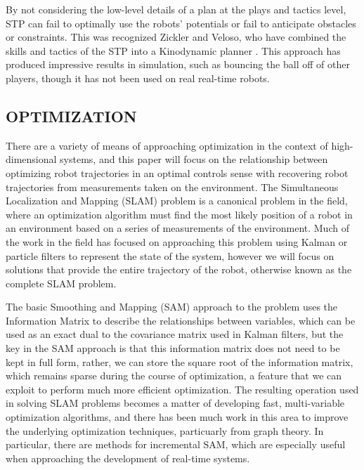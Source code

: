 \documentclass[a4paper, 10pt, conference]{ieeeconf}      %
\begin{document}
By not considering the low-level details of a plan at the plays and tactics level, STP can fail to optimally use the robots' potentials or fail to anticipate obstacles or constraints. This was recognized Zickler and Veloso, who have combined the skills and tactics of the STP into a Kinodynamic planner \cite{zickler2008playing}. This approach has produced impressive results in simulation, such as bouncing the ball off of other players, though it has not been used on real real-time robots.

\subsection{OPTIMIZATION}

There are a variety of means of approaching optimization in the context of high-dimensional systems, and this paper will focus on the relationship between optimizing robot trajectories in an optimal controls sense with recovering robot trajectories from measurements taken on the environment.  The Simultaneous Localization and Mapping (SLAM) problem is a canonical problem in the field, where an optimization algorithm must find the most likely position of a robot in an environment based on a series of measurements of the environment.  Much of the work in the field has focused on approaching this problem using Kalman or particle filters  \cite{Thrun05book, Thrun04ijrr, Dellaert03tutorial} to represent the state of the system, however we will focus on solutions that provide the entire trajectory of the robot, otherwise known as the complete SLAM problem.  

The basic Smoothing and Mapping (SAM) approach\cite{Dellaert05tr} to the problem uses the Information Matrix to describe the relationships between variables, which can be used as an exact dual to the covariance matrix used in Kalman filters, but the key in the SAM approach is that this information matrix does not need to be kept in full form, rather, we can store the square root of the information matrix, which remains sparse during the course of optimization, a feature that we can exploit to perform much more efficient optimization.  The resulting operation used in solving SLAM problems becomes a matter of developing fast, multi-variable optimization algorithms, and there has been much work in this area to improve the underlying optimization techniques, particuarly from graph theory\cite{Triggs99, Bertele72jmaa, Bertele72book}.  In particular, there are methods for incremental SAM\cite{Dellaert06ijrr}, which are especially useful when approaching the development of real-time systems.
\end{document}
